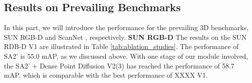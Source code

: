 \documentclass[runningheads]{llncs}
\begin{document}
\setlength{\tabcolsep}{4pt}
\begin{table}
\begin{center}
\end{center}
\caption{Comparison of our method with state of the art algorithm on ScanNetV2, evaluated with mAP @0.5.}
\label{tab:SCanNet0.5}
\end{table}



\subsection{Results on Prevailing Benchmarks}
In this part, we will introduce the performance for the prevailing 3D benchmarks, SUN RGB-D \cite{SUN_RGBD} and ScanNet \cite{SCannet}, respectively. 
\noindent\textbf{SUN RGB-D} The results on the SUN RDB-D V1 are illustrated in Table \ref{tab:ablation_studies}. The performance of SA2' is 55.0 mAP, as we discussed above. With one stage of our module involved, the SA2' + Dense Point Diffusion V2(3) has reached the performance of 58.7 mAP, which is comparable with the best performance of XXXX V1.
\end{document}
